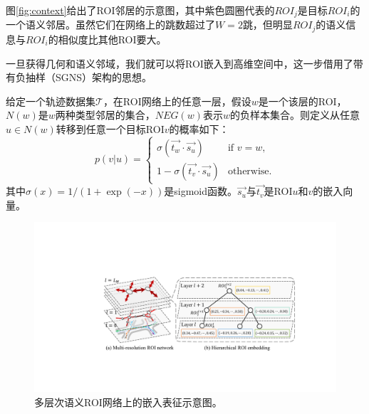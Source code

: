图\ref{fig:context}给出了ROI邻居的示意图，其中紫色圆圈代表的${ROI}_j$是目标${ROI}_i$的一个语义邻居。虽然它们在网络上的跳数超过了$W=2$跳，但明显${ROI}_j$的语义信息与${ROI}_i$的相似度比其他ROI要大。

一旦获得几何和语义邻域，我们就可以将ROI嵌入到高维空间中，这一步借用了带有负抽样（SGNS）架构的思想。

给定一个轨迹数据集$\mathcal{T}$，在ROI网络上的任意一层，假设$w$是一个该层的ROI，$N(w)$是$w$两种类型邻居的集合，$NEG(w)$表示$w$的负样本集合。则定义从任意$u\in{N(w)}$转移到任意一个目标ROI$v$的概率如下：
\begin{equation}
\label{eq:transP}
p(v|u) =
\begin{cases}
\sigma(\vec{t_w}\cdot{}\vec{s_u}) & \text{if } v = w,\\
1- \sigma(\vec{t_v}\cdot{}\vec{s_u}) & \text{otherwise}.
\end{cases}
\end{equation}
其中$\sigma(x)=1/(1+\exp{(-x)})$是sigmoid函数。$\vec{s_u}$与$\vec{t_v}$是ROI$u$和$v$的嵌入向量。


\begin{figure}[!t]
\centering
\includegraphics[width=130mm]{pics/Hembedding.pdf}
\caption {多层次语义ROI网络上的嵌入表征示意图。}
\label{fig:Hembedding}
\end{figure}

